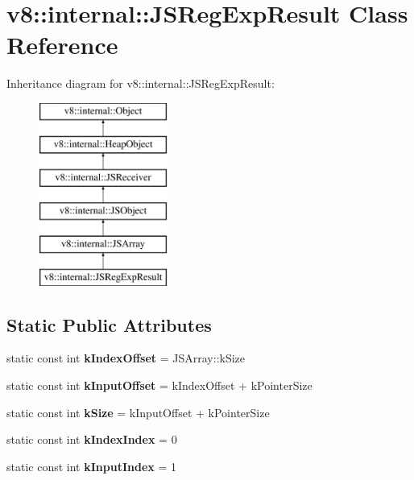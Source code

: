 \hypertarget{classv8_1_1internal_1_1_j_s_reg_exp_result}{}\section{v8\+:\+:internal\+:\+:J\+S\+Reg\+Exp\+Result Class Reference}
\label{classv8_1_1internal_1_1_j_s_reg_exp_result}
Inheritance diagram for v8\+:\+:internal\+:\+:J\+S\+Reg\+Exp\+Result\+:\begin{figure}[H]
\begin{center}
\leavevmode
\includegraphics[height=6.000000cm]{classv8_1_1internal_1_1_j_s_reg_exp_result}
\end{center}
\end{figure}
\subsection*{Static Public Attributes}
\begin{DoxyCompactItemize}
\item 
static const int {\bfseries k\+Index\+Offset} = J\+S\+Array\+::k\+Size\hypertarget{classv8_1_1internal_1_1_j_s_reg_exp_result_a0e1056c3ef480c83d8c00cca5f5c68cf}{}\label{classv8_1_1internal_1_1_j_s_reg_exp_result_a0e1056c3ef480c83d8c00cca5f5c68cf}

\item 
static const int {\bfseries k\+Input\+Offset} = k\+Index\+Offset + k\+Pointer\+Size\hypertarget{classv8_1_1internal_1_1_j_s_reg_exp_result_a061bea65d9c9d770c109386aa3482d61}{}\label{classv8_1_1internal_1_1_j_s_reg_exp_result_a061bea65d9c9d770c109386aa3482d61}

\item 
static const int {\bfseries k\+Size} = k\+Input\+Offset + k\+Pointer\+Size\hypertarget{classv8_1_1internal_1_1_j_s_reg_exp_result_add2f94b506eee3084d490de4c67a3bef}{}\label{classv8_1_1internal_1_1_j_s_reg_exp_result_add2f94b506eee3084d490de4c67a3bef}

\item 
static const int {\bfseries k\+Index\+Index} = 0\hypertarget{classv8_1_1internal_1_1_j_s_reg_exp_result_a1a10ad481cbf4e7bb27b376d827155ea}{}\label{classv8_1_1internal_1_1_j_s_reg_exp_result_a1a10ad481cbf4e7bb27b376d827155ea}

\item 
static const int {\bfseries k\+Input\+Index} = 1\hypertarget{classv8_1_1internal_1_1_j_s_reg_exp_result_a4f1188f12cec956861acdbfbaf20fe8b}{}\label{classv8_1_1internal_1_1_j_s_reg_exp_result_a4f1188f12cec956861acdbfbaf20fe8b}

\end{DoxyCompactItemize}
